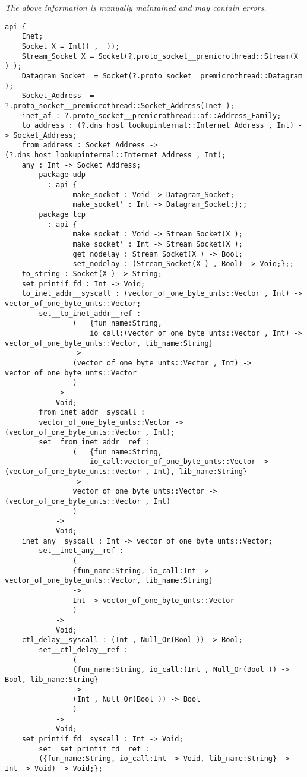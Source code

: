 \label{api:Internet\_Socket\_\_Premicrothread}

{\tiny \it The above information is manually maintained and may contain errors.}
\begin{verbatim}
api {
    Inet;
    Socket X = Int((_, _));
    Stream_Socket X = Socket(?.proto_socket__premicrothread::Stream(X ) );
    Datagram_Socket  = Socket(?.proto_socket__premicrothread::Datagram );
    Socket_Address  = ?.proto_socket__premicrothread::Socket_Address(Inet );
    inet_af : ?.proto_socket__premicrothread::af::Address_Family;
    to_address : (?.dns_host_lookupinternal::Internet_Address , Int) -> Socket_Address;
    from_address : Socket_Address -> (?.dns_host_lookupinternal::Internet_Address , Int);
    any : Int -> Socket_Address;
        package udp
          : api {
                make_socket : Void -> Datagram_Socket;
                make_socket' : Int -> Datagram_Socket;};;
        package tcp
          : api {
                make_socket : Void -> Stream_Socket(X );
                make_socket' : Int -> Stream_Socket(X );
                get_nodelay : Stream_Socket(X ) -> Bool;
                set_nodelay : (Stream_Socket(X ) , Bool) -> Void;};;
    to_string : Socket(X ) -> String;
    set_printif_fd : Int -> Void;
    to_inet_addr__syscall : (vector_of_one_byte_unts::Vector , Int) -> vector_of_one_byte_unts::Vector;
        set__to_inet_addr__ref :
                (   {fun_name:String,
                    io_call:(vector_of_one_byte_unts::Vector , Int) -> vector_of_one_byte_unts::Vector, lib_name:String}
                ->
                (vector_of_one_byte_unts::Vector , Int) -> vector_of_one_byte_unts::Vector
                )
            ->
            Void;
        from_inet_addr__syscall :
        vector_of_one_byte_unts::Vector -> (vector_of_one_byte_unts::Vector , Int);
        set__from_inet_addr__ref :
                (   {fun_name:String,
                    io_call:vector_of_one_byte_unts::Vector -> (vector_of_one_byte_unts::Vector , Int), lib_name:String}
                ->
                vector_of_one_byte_unts::Vector -> (vector_of_one_byte_unts::Vector , Int)
                )
            ->
            Void;
    inet_any__syscall : Int -> vector_of_one_byte_unts::Vector;
        set__inet_any__ref :
                (
                {fun_name:String, io_call:Int -> vector_of_one_byte_unts::Vector, lib_name:String}
                ->
                Int -> vector_of_one_byte_unts::Vector
                )
            ->
            Void;
    ctl_delay__syscall : (Int , Null_Or(Bool )) -> Bool;
        set__ctl_delay__ref :
                (
                {fun_name:String, io_call:(Int , Null_Or(Bool )) -> Bool, lib_name:String}
                ->
                (Int , Null_Or(Bool )) -> Bool
                )
            ->
            Void;
    set_printif_fd__syscall : Int -> Void;
        set__set_printif_fd__ref :
        ({fun_name:String, io_call:Int -> Void, lib_name:String} -> Int -> Void) -> Void;};
\end{verbatim}
